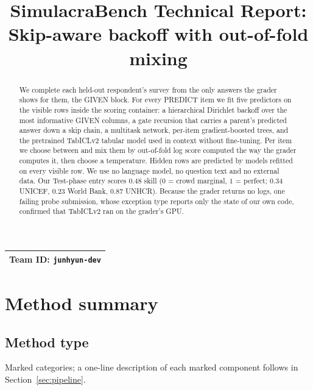\documentclass{article}
\title{SimulacraBench Technical Report:\\ Skip-aware backoff with out-of-fold mixing}
\newcommand{\teamid}{\texttt{junhyun-dev}}
\begin{document}
\maketitle

\begin{center}
\begin{tabular}{l}
\toprule
\textbf{Team ID:} \teamid \\
\bottomrule
\end{tabular}
\end{center}

\begin{abstract}
We complete each held-out respondent's survey from the only answers the grader
shows for them, the GIVEN block. For every PREDICT item we fit five predictors
on the visible rows inside the scoring container: a hierarchical Dirichlet
backoff over the most informative GIVEN columns, a gate recursion that carries a
parent's predicted answer down a skip chain, a multitask network, per-item
gradient-boosted trees, and the pretrained TabICLv2 tabular model used in
context without fine-tuning. Per item we choose between and mix them by
out-of-fold log score computed the way the grader computes it, then choose a
temperature. Hidden rows are predicted by models refitted on every visible row.
We use no language model, no question text and no external data. Our Test-phase
entry scores $0.48$ skill ($0$ = crowd marginal, $1$ = perfect; $0.34$ UNICEF,
$0.23$ World Bank, $0.87$ UNHCR). Because the grader returns no logs, one
failing probe submission, whose exception type reports only the state of our own
code, confirmed that TabICLv2 ran on the grader's GPU.
\end{abstract}

\section{Method summary}
\label{sec:method}

\subsection{Method type}
Marked categories; a one-line description of each marked component follows in Section~\ref{sec:pipeline}.
\end{document}
